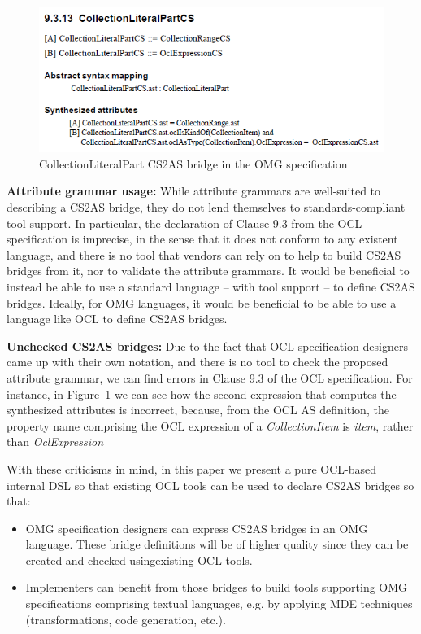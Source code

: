 \documentclass{llncs}
\begin{document}
\begin{figure}[htbp]
\centering
\includegraphics[scale=0.75]{images/CollectionLiteralPartOMG.png}
\caption{CollectionLiteralPart CS2AS bridge in the OMG specification}
\label{fig:CollectionLiteralPartOMG}
\end{figure}

\textbf{Attribute grammar usage:} While attribute grammars are well-suited to describing a CS2AS bridge, they do not lend themselves to standards-compliant tool support. In particular, the declaration of Clause 9.3 from the OCL specification is imprecise, in the sense that it does not conform to any existent language, and there is no tool that vendors can rely on to help to build CS2AS bridges from it, nor to validate the attribute grammars. It would be beneficial to instead be able to use a standard language -- with tool support -- to define CS2AS bridges. Ideally, for OMG languages, it would be beneficial to be able to use a language like OCL to define CS2AS bridges. 

\textbf{Unchecked CS2AS bridges:} Due to the fact that OCL specification designers came up with their own notation, and there is no tool to check the proposed attribute grammar, we can find errors in Clause 9.3 of the OCL specification. For instance, in Figure~\ref{fig:CollectionLiteralPartOMG} we can see how the second expression that computes the synthesized attributes is incorrect, because, from the OCL AS definition, the property name comprising the OCL expression of a \emph{CollectionItem} is \emph{item}, rather than \emph{OclExpression}

With these criticisms in mind, in this paper we present a pure OCL-based internal DSL so that existing OCL tools can be used to declare CS2AS bridges so that:

\begin{itemize}
\item OMG specification designers can express CS2AS bridges in an OMG language. These bridge definitions will be of higher quality since they can be created and checked usingexisting OCL tools.
\item Implementers can benefit from those bridges to build tools supporting OMG specifications comprising textual languages, e.g. by applying MDE techniques (transformations, code generation, etc.).
\end{itemize}
\end{document}
